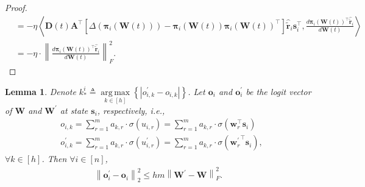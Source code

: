 \documentclass[10pt]{article}
\def\rvo{{\mathbf{o}}}
\def\rvs{{\mathbf{s}}}
\def\rvw{{\mathbf{w}}}
\def\rvo{{\mathbf{o}}}
\def\rvtilder{{\tilde{\mathbf{r}}}}
\newtheorem{lem}{Lemma}
\def\rvpi{{\boldsymbol{\pi}}}
\def\rmA{{\mathbf{A}}}
\def\rmD{{\mathbf{D}}}
\def\rmW{{\mathbf{W}}}
\DeclareMathOperator*{\argmax}{arg\,max}
\begin{document}
\begin{proof}
\begin{equation*}
\begin{split}
    &= - \eta \left\langle \rmD(t) \rmA^\top \left[\Delta\left( \rvpi_i\left( \rmW(t) \right) \right) - \rvpi_i\left( \rmW(t) \right) \rvpi_i\left( \rmW(t) \right)^\top \right] \hat{\rvtilder}_i \rvs_i^\top, \frac{d \rvpi_i\left(\rmW(t)\right)^\top \hat{\rvtilder}_i}{d \rmW(t)} \right\rangle \\
    &= - \eta \cdot \left\| \frac{d \rvpi_i\left(\rmW(t)\right)^\top \hat{\rvtilder}_i}{d \rmW(t)} \right\|_F^2.
\end{split}
\end{equation*}
\end{proof}

\begin{lem}
\label{lem:logit_upper_bound_parameter}
Denote $k_*^i \triangleq \argmax\limits_{k \in [h]}\left\{ \left| o_{i,k}^\prime - o_{i,k} \right| \right\}$. Let $\rvo_i$ and $\rvo_i^\prime$ be the logit vector of $\rmW$ and $\rmW^\prime$ at state $\rvs_i$, respectively, i.e.,
\begin{equation*}
\begin{split}
    &o_{i,k} = \sum\limits_{r=1}^{m}{ a_{k,r} \cdot \sigma\left( u_{i,r} \right)} = \sum\limits_{r=1}^{m}{ a_{k,r} \cdot \sigma\left(\rvw_r^\top \rvs_i \right)} \\
    &o_{i,k}^\prime = \sum\limits_{r=1}^{m}{ a_{k,r} \cdot \sigma\left( u_{i,r}^\prime \right)} = \sum\limits_{r=1}^{m}{ a_{k,r} \cdot \sigma\left({\rvw_r^\prime}^\top \rvs_i \right)},
\end{split}
\end{equation*}
$\forall k \in [h]$. Then $\forall i \in [n]$,
\begin{equation*}
\begin{split}
    \left\| \rvo_i^\prime - \rvo_i \right\|_2^2 \le h m \left\| \rmW^\prime - \rmW \right\|_F^2.
\end{split}
\end{equation*}
\end{lem}
\end{document}
